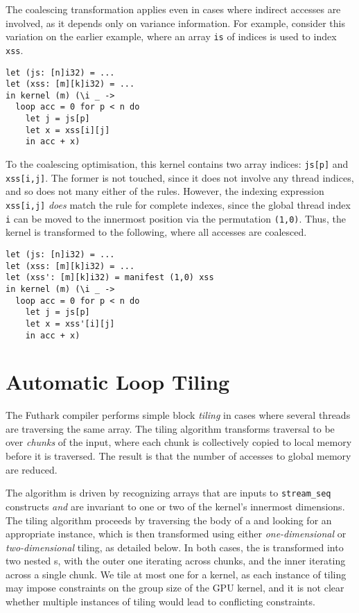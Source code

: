 The coalescing transformation applies even in cases where indirect
accesses are involved, as it depends only on variance information.
For example, consider this variation on the earlier example, where an
array \texttt{is} of indices is used to index \texttt{xss}.

\begin{lstlisting}[numbers=none]
let (js: [n]i32) = ...
let (xss: [m][k]i32) = ...
in kernel (m) (\i _ ->
  loop acc = 0 for p < n do
    let j = js[p]
    let x = xss[i][j]
    in acc + x)
\end{lstlisting}

To the coalescing optimisation, this kernel contains two array
indices: \texttt{js[p]} and \texttt{xss[i,j]}.  The former is not
touched, since it does not involve any thread indices, and so does not
many either of the rules.  However, the indexing expression
\texttt{xss[i,j]} \textit{does} match the rule for complete indexes,
since the global thread index \texttt{i} can be moved to the innermost
position via the permutation \texttt{(1,0)}.  Thus, the kernel is
transformed to the following, where all accesses are coalesced.

\begin{lstlisting}[numbers=none]
let (js: [n]i32) = ...
let (xss: [m][k]i32) = ...
let (xss': [m][k]i32) = manifest (1,0) xss
in kernel (m) (\i _ ->
  loop acc = 0 for p < n do
    let j = js[p]
    let x = xss'[i][j]
    in acc + x)
\end{lstlisting}


\section{Automatic Loop Tiling}
\label{sec:automatic-tiling}

The Futhark compiler performs simple block \textit{tiling} in cases
where several threads are traversing the same array.  The tiling
algorithm transforms traversal to be over \textit{chunks} of the
input, where each chunk is collectively copied to local memory before
it is traversed.  The result is that the number of accesses to global
memory are reduced.

The algorithm is driven by recognizing arrays that are inputs to
\lstinline{stream_seq} constructs \textit{and} are invariant to one or
two of the kernel's innermost dimensions.  The tiling algorithm
proceeds by traversing the body of a  and looking for an
appropriate \StreamSeq{} instance, which is then transformed using
either \textit{one-dimensional} or \textit{two-dimensional} tiling, as
detailed below.  In both cases, the \StreamSeq{} is transformed into
two nested \StreamSeq{}s, with the outer one iterating across chunks,
and the inner iterating across a single chunk.  We tile at most one
\StreamSeq{} for a kernel, as each instance of tiling may impose
constraints on the group size of the GPU kernel, and it is not clear
whether multiple instances of tiling would lead to conflicting
constraints.

